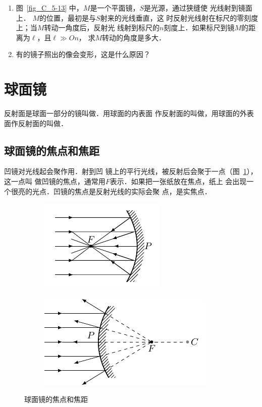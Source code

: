 \begin{enumerate}
    \item 图~\ref{fig_C_5-13} 中，$M$是一个平面镜，$S$是光源，通过狭缝使
    光线射到镜面上．
    $M$的位置，最初是与$S$射来的光线垂直，这
    时反射光线射在标尺的零刻度上；当$M$转动一角度后，反射光
    线射到标尺的$n$刻度上．如果标尺到镜$M$的距离为$\ell$，且$\ell\gg On$，
    求$M$转动的角度是多大．
    \item 有的镜子照出的像会变形，这是什么原因？
    
\end{enumerate}
    
\section{球面镜}
反射面是球面一部分的镜叫做．用球面的内表面
作反射面的叫做，用球面的外表面作反射面的叫做．

\subsection{球面镜的焦点和焦距}

凹镜对光线起会聚作用．射到凹
镜上的平行光线，被反射后会聚于一点（图~\ref{fig_C_5-14a}），这一点叫
做凹镜的焦点，通常用$F$表示．如果把一张纸放在焦点，纸上
会出现一个很亮的光点．凹镜的焦点是反射光线的实际会聚
点，是实焦点．
\begin{figure}[htbp]
    \centering
    \begin{subfigure}{0.4\linewidth}
        \centering
        \includegraphics{fig/C/5-14a.pdf}
        \caption{}\label{fig_C_5-14a}
    \end{subfigure}
    \hfil
    \begin{subfigure}{0.4\linewidth}
        \centering
        \includegraphics{fig/C/5-14b.pdf}
        \caption{}\label{fig_C_5-14b}
    \end{subfigure}
    \caption{球面镜的焦点和焦距}\label{fig_C_5-14}
\end{figure}

